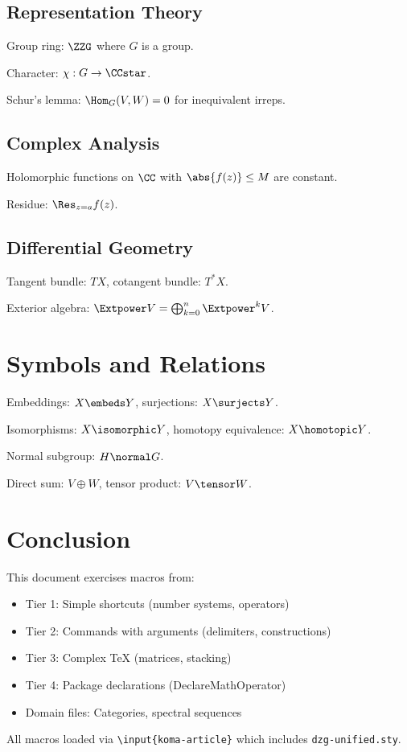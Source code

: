\documentclass[11pt]{scrartcl}
\begin{document}
\subsection{Representation Theory}
Group ring: $\ZZG$ where $G$ is a group.

Character: $\chi: G \to \CCstar$.

Schur's lemma: $\Hom_G(V, W) = 0$ for inequivalent irreps.

\subsection{Complex Analysis}
Holomorphic functions on $\CC$ with $\abs{f(z)} \leq M$ are constant.

Residue: $\Res_{z=a} f(z)$.

\subsection{Differential Geometry}
Tangent bundle: $TX$, cotangent bundle: $T^*X$.

Exterior algebra: $\Extpower V = \bigoplus_{k=0}^n \Extpower^k V$.

\section{Symbols and Relations}

Embeddings: $X \embeds Y$, surjections: $X \surjects Y$.

Isomorphisms: $X \isomorphic Y$, homotopy equivalence: $X \homotopic Y$.

Normal subgroup: $H \normal G$.

Direct sum: $V \oplus W$, tensor product: $V \tensor W$.

\section{Conclusion}

This document exercises macros from:
\begin{itemize}
\item Tier 1: Simple shortcuts (number systems, operators)
\item Tier 2: Commands with arguments (delimiters, constructions)
\item Tier 3: Complex TeX (matrices, stacking)
\item Tier 4: Package declarations (DeclareMathOperator)
\item Domain files: Categories, spectral sequences
\end{itemize}

All macros loaded via \texttt{\textbackslash input\{koma-article\}} which includes \texttt{dzg-unified.sty}.
\end{document}
